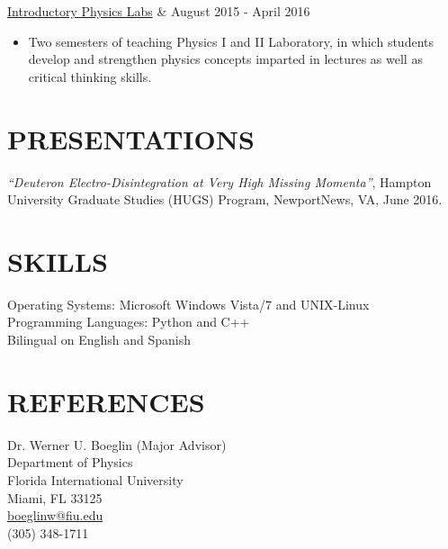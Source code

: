 \documentclass[margin]{res}
\begin{document}
\begin{resume}
                 \begin{ncolumn}{2} %
                \underline{Introductory Physics Labs} &   August 2015 - April 2016 
                \end{ncolumn}
                \vspace{1mm}
                
                  \begin{itemize}
              
                  \item Two semesters of teaching Physics I and II Laboratory, 
                        in which students develop and strengthen physics 
                        concepts imparted in lectures as well as critical thinking skills.    
                  
                  \end{itemize}
              
              
             
              
 \section{\footnotesize PRESENTATIONS}
\textit{\enquote{Deuteron Electro-Disintegration at Very High Missing Momenta}}, Hampton University
		Graduate Studies (HUGS) Program, NewportNews, VA, June 2016. 
		

\section{\footnotesize SKILLS} Operating Systems: Microsoft Windows Vista/7 and UNIX-Linux \\  
                  Programming Languages: Python and C++  \\
                  Bilingual on English and Spanish




\newpage
\section{REFERENCES}              Dr. Werner U. Boeglin (Major Advisor) \\
                                  Department of Physics \\
                                  Florida International University \\
                                  Miami, FL 33125 \\
                                 \Email \hspace{0.5mm} \href{mailto:boeglinw@fiu.edu}{boeglinw@fiu.edu} \\                           
                                 \phone \hspace{0.5mm} (305) 348-1711 
                                  

\end{resume}
\end{document}
